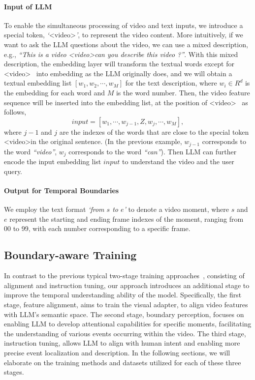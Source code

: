 \documentclass[10pt,twocolumn,letterpaper]{article}
\begin{document}
\paragraph{Input of LLM} To enable the simultaneous processing of video and text inputs, we introduce a special token, \textit{`}\textless video\textgreater\textit{'}, to represent the video content. More intuitively, if we want to ask the LLM questions about the video, we can use a mixed description, e.g., \textit{``This is a video \textless video\textgreater  can you describe this video ?''}. With this mixed description, the embedding layer will transform the textual words except for \textless video\textgreater ~ into embedding as the LLM originally does, and we will obtain a textual embedding list $[w_1, w_2, \cdots, w_M]$ for the text description, where $w_i \in R^d$ is the embedding for each word and $M$ is the word number. Then, the video feature sequence will be inserted into the embedding list, at the position of \textless video\textgreater ~ as follows,
\begin{equation}
   input=[w_1, \cdots, w_{j-1}, Z, w_{j}, \cdots, w_M ],
\end{equation}
where $j-1$ and $j$ are the indexes of the words that are close to the special token \textless video\textgreater in the original sentence. (In the previous example, $w_{j-1}$ corresponds to the word \textit{``video''}, $w_{j}$ corresponds to the word \textit{``can''}). Then LLM can further encode the input embedding list $input$ to understand the video and the user query.

\paragraph{Output for Temporal Boundaries} We employ the text format \textit{`from $s$ to $e$'} to denote a video moment, where $s$ and $e$ represent the starting and ending frame indexes of the moment, ranging from 00 to 99, with each number corresponding to a specific frame. 



\subsection{Boundary-aware Training}

In contrast to the previous typical two-stage training approaches~\cite{li2023videochat, zhang2023videollama, maaz2023videochatgpt}, consisting of alignment and instruction tuning, our approach introduces an additional stage to improve the temporal understanding ability of the model. Specifically, the first stage, feature alignment, aims to train the visual adapter, to align video features with LLM's semantic space. The second stage, boundary perception, focuses on enabling LLM to develop attentional capabilities for specific moments, facilitating the understanding of various events occurring within the video. The third stage, instruction tuning, allows LLM to align with human intent and enabling more precise event localization and description. In the following sections, we will elaborate on the training methods and datasets utilized for each of these three stages.
\end{document}
